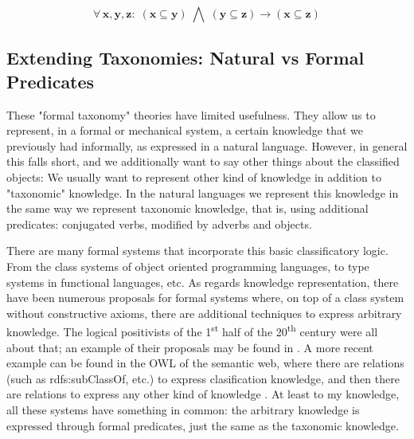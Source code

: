 \documentclass{IOS-Book-Article}     %
\begin{document}
\begin{equation}
\forall\,\mathbf{x\mathrm{,\mathbf{y\mathrm{,\mathbf{z}:\;\left(\mathbf{x\subseteq y}\right)\;\bigwedge\;\left(\mathbf{y\subseteq\mathbf{z}}\right)\rightarrow\left(\mathbf{x\subseteq\mathbf{z}}\right)}}}}
\end{equation}

\subsection{Extending Taxonomies: Natural vs Formal Predicates}
These "formal taxonomy" theories have limited usefulness. They allow us to
represent, in a formal or mechanical system, a certain knowledge that we
previously had informally, as expressed in a natural language. However,
in general this falls short, and we additionally want to say other things about
the classified objects: We usually want to represent other kind of knowledge
in addition to "taxonomic" knowledge. In the natural languages we represent
this knowledge in the same way we represent taxonomic knowledge, that is,
using additional predicates: conjugated verbs, modified by adverbs and objects.

There are many formal systems that incorporate this basic classificatory logic.
From the class systems of object oriented programming languages,
to type systems in functional languages, etc. As regards knowledge representation,
there have been numerous proposals for formal systems where,
on top of a class system without constructive axioms, there are
additional techniques to express arbitrary knowledge.
The  logical positivists of the 1\textsuperscript{st} half of the
20\textsuperscript{th} century were all about that;
an example of their proposals may be found in \cite{r3}.
A more recent example can be found in the OWL of the semantic web,
where there are relations (such as rdfs:subClassOf, etc.)
to express clasification knowledge, and then there are relations to express
any other kind of knowledge \cite{r4}. At least to my knowledge, all these
systems have something in common: the arbitrary knowledge is expressed through
formal predicates, just the same as the taxonomic knowledge.
\end{document}
